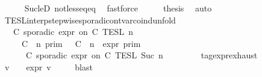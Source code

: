 \begin{isabellebody}
\ \ \ \ \isamarkupfalse%
\ Suc{\isacharunderscore}leD\ not{\isacharunderscore}less{\isacharunderscore}eq{\isacharunderscore}eq\ \isamarkupfalse%
\ fastforce\isanewline
\ \ \isamarkupfalse%
\ \isamarkupfalse%
\ {\isacharquery}thesis\ \isamarkupfalse%
\ auto\isanewline
{}\isamarkupfalse%
%
\endisatagproof
{\isafoldproof}%
%
\isadelimproof
\isanewline
%
\endisadelimproof
\isanewline
{}\isamarkupfalse%
\ TESL{\isacharunderscore}interp{\isacharunderscore}stepwise{\isacharunderscore}sporadicon{\isacharunderscore}tvar{\isacharunderscore}coind{\isacharunderscore}unfold{}{\isacharcolon}\isanewline
\ \ {\isacartoucheopen}{\isasymlbrakk}\ C\ sporadic{\isasymsharp}\ {\isasymtau}\isactrlsub e\isactrlsub x\isactrlsub p\isactrlsub r\ on\ C\ {\isasymrbrakk}\isactrlsub T\isactrlsub E\isactrlsub S\isactrlsub L\isactrlbsup {\isasymge}\ n\isactrlesup \ {\isacharequal}\isanewline
\ \ \ \ {\isasymlbrakk}\ C\ {\isasymUp}\ n\ {\isasymrbrakk}\isactrlsub p\isactrlsub r\isactrlsub i\isactrlsub m\ {\isasyminter}\ {\isasymlbrakk}\ C\ {\isasymDown}\ n\ {\isacharat}{\isasymsharp}\ {\isasymtau}\isactrlsub e\isactrlsub x\isactrlsub p\isactrlsub r\ {\isasymrbrakk}\isactrlsub p\isactrlsub r\isactrlsub i\isactrlsub m\ \ \ \ \ \ \ \ %
\isanewline
\ \ \ \ {\isasymunion}\ {\isasymlbrakk}\ C\ sporadic{\isasymsharp}\ {\isasymtau}\isactrlsub e\isactrlsub x\isactrlsub p\isactrlsub r\ on\ C\ {\isasymrbrakk}\isactrlsub T\isactrlsub E\isactrlsub S\isactrlsub L\isactrlbsup {\isasymge}\ Suc\ n\isactrlesup {\isacartoucheclose}\ \ \ %
\isanewline
%
\isadelimproof
%
\endisadelimproof
%
\isatagproof
{}\isamarkupfalse%
\ {\isacharminus}\isanewline
\ \ \isamarkupfalse%
\ tag{\isacharunderscore}expr{\isachardot}exhaust\ \isamarkupfalse%
\ v\ {\isasymtau}\ \ {\isacartoucheopen}\ {\isasymtau}\isactrlsub e\isactrlsub x\isactrlsub p\isactrlsub r{\isacharequal}{\isasymlparr}\ v\ {\isasymoplus}\ {\isasymtau}\ {\isasymrparr}{\isacartoucheclose}\ \isamarkupfalse%
\ blast\isanewline
\ \ \isamarkupfalse%
\ \isamarkupfalse%

\end{isabellebody}
